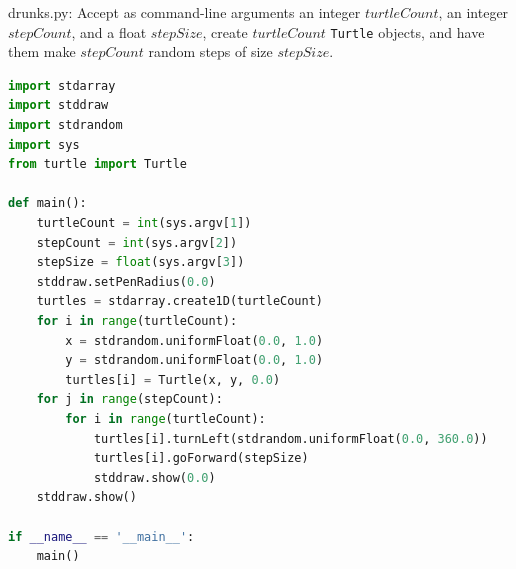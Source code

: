 \documentclass[8pt,a4paper,compress]{beamer}
\begin{document}
\begin{frame}[fragile]
\pause

\begin{framed}
\tiny drunks.py: Accept as command-line arguments an integer $turtleCount$, an integer $stepCount$, and a float $stepSize$, create $turtleCount$ \lstinline{Turtle} objects, and have them make $stepCount$ random steps of size $stepSize$.
\end{framed}

\begin{lstlisting}[language=Python]
import stdarray
import stddraw
import stdrandom
import sys
from turtle import Turtle

def main():
    turtleCount = int(sys.argv[1])
    stepCount = int(sys.argv[2])
    stepSize = float(sys.argv[3])
    stddraw.setPenRadius(0.0)
    turtles = stdarray.create1D(turtleCount)
    for i in range(turtleCount):
        x = stdrandom.uniformFloat(0.0, 1.0)
        y = stdrandom.uniformFloat(0.0, 1.0)
        turtles[i] = Turtle(x, y, 0.0)
    for j in range(stepCount):
        for i in range(turtleCount):
            turtles[i].turnLeft(stdrandom.uniformFloat(0.0, 360.0))
            turtles[i].goForward(stepSize)
            stddraw.show(0.0)
    stddraw.show()
    
if __name__ == '__main__':
    main()
\end{lstlisting}
\end{frame}
\end{document}

